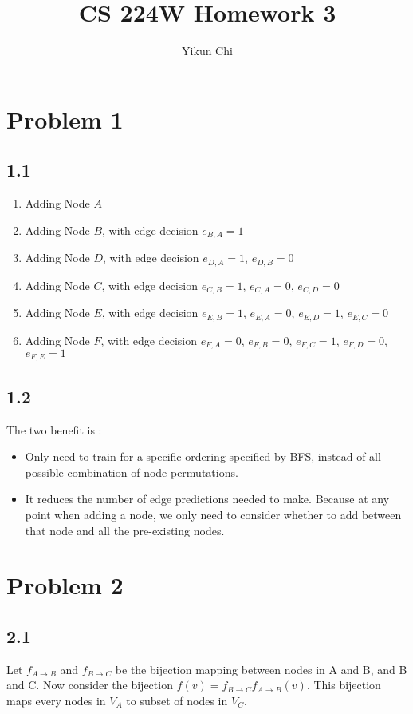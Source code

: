 \documentclass{article}
\title{CS 224W Homework 3}
\author{Yikun Chi}
\begin{document}
\section*{Problem 1}
\subsection*{1.1}
    \begin{enumerate}
        \item Adding Node $A$
        \item Adding Node $B$, with edge decision $e_{B,A}=1$
        \item Adding Node $D$, with edge decision $e_{D,A} = 1$, $e_{D,B} = 0$
        \item Adding Node $C$, with edge decision $e_{C,B} = 1$, $e_{C,A} = 0$, $e_{C,D} = 0$
        \item Adding Node $E$, with edge decision $e_{E,B} = 1$, $e_{E,A} = 0$, $e_{E,D} = 1$,  $e_{E,C} = 0$
        \item Adding Node $F$, with edge decision $e_{F,A} = 0$, $e_{F,B} = 0$, $e_{F,C} = 1$,  $e_{F,D} = 0$, $e_{F,E} = 1$
    \end{enumerate}
\subsection*{1.2}
The two benefit is : 
    \begin{itemize}
        \item Only need to train for a specific ordering specified by BFS, instead of all possible combination of node permutations. 
        \item It reduces the number of edge predictions needed to make. Because at any point when adding a node, we only need to consider whether to add between that node and all the pre-existing nodes. 
    \end{itemize}

\newpage
\section*{Problem 2}
\subsection*{2.1}
Let $f_{A\to B}$ and $f_{B\to C}$ be the bijection mapping between nodes in A and B, and B and C. Now consider the bijection $f(v) = f_{B\to C}f_{A\to B}(v)$. This bijection maps every nodes in $V_A$ to subset of nodes in $V_C$. \\ \par
\end{document}
